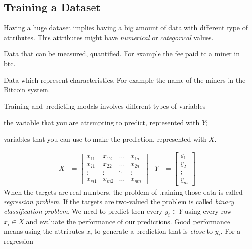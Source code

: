 \documentclass[USenglish]{uit-thesis}
\begin{document}
\subsection{Training a Dataset}
\label{sec:trainingdataset}
Having a huge dataset implies having a big amount
of data with different type of attributes. This attributes might have
\emph{numerical} or \emph{categorical} values. 
\begin{description}[leftmargin=!, labelwidth=\widthof{\bfseries -Categorical- }, noitemsep]
	\item [Numerical:] Data that can be measured, quantified. For example
	the fee paid to a miner in \gls{btc}.
	\item [Categorical:]Data which represent characteristics. For
	example the name of the miners in the Bitcoin system.
\end{description}
Training and predicting models involves different types of variables:
\begin{description}[leftmargin=!, labelwidth=\widthof{\bfseries -Target variables- }, noitemsep]
	\item[Target variables:] the variable that you are attempting to predict, represented with $Y$;
	\item[Predictors:] variables that you can use to make the prediction, represented with $X$.
\end{description}
\begin{align}
X &=\begin{bmatrix}
x_{11} & x_{12}  & \dots & x_{1n}\\
x_{21} & x_{22} & \dots & x_{2n}\\
\vdots & \vdots & \ddots& \vdots\\
x_{m1} & x_{m2} & \dots & x_{mn}
\end{bmatrix} &
Y &=\begin{bmatrix}
y_{1}\\
y_{2}\\
\vdots\\
y_{m}
\end{bmatrix} 
\end{align}
When the targets are real numbers,
the problem of training those data is called
\emph{regression problem}. If the targets are two-valued
the problem is called \emph{binary classification problem}.
We need to predict then every $y_i \in Y$ using every row
$x_i \in X$ and evaluate the performance of our predictions.
Good performance means using the attributes $x_i$ to generate
a prediction that is \emph{close} to $y_i$. For a regression
\end{document}
